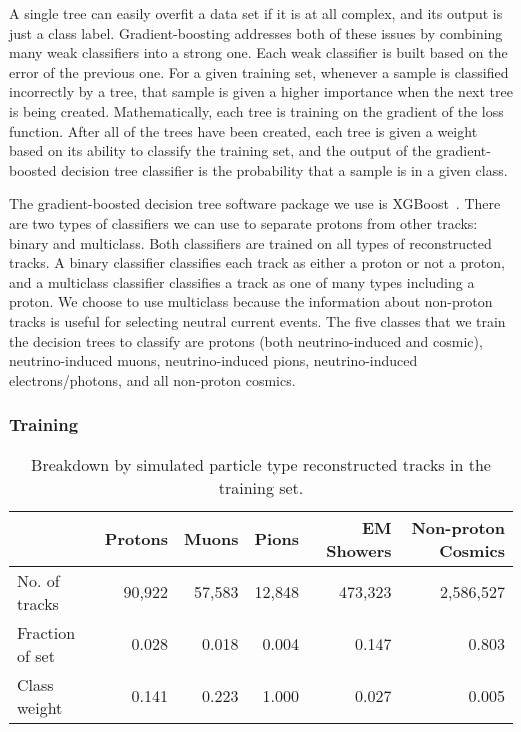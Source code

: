     A single tree can easily overfit a data set if it is at all complex, and
    its output is just a class label. Gradient-boosting addresses both of these
    issues by combining many weak classifiers into a strong one. Each weak
    classifier is built based on the error of the previous one. For a given
    training set, whenever a sample is classified incorrectly by a tree, that
    sample is given a higher importance when the next tree is being created.
    Mathematically, each tree is training on the gradient of the loss function.
    After all of the trees have been created, each tree is given a weight based
    on its ability to classify the training set, and the output of the
    gradient-boosted decision tree classifier is the probability that a sample
    is in a given class.
    
    The gradient-boosted decision tree software package we use is
    XGBoost~\cite{Chen:2016btl}. There are two types of classifiers we can use
    to separate protons from other tracks: binary and multiclass. Both
    classifiers are trained on all types of reconstructed tracks. A binary
    classifier classifies each track as either a proton or not a proton, and a
    multiclass classifier classifies a track as one of many types including a
    proton. We choose to use multiclass because the information about
    non-proton tracks is useful for selecting neutral current events. The five
    classes that we train the decision trees to classify are protons (both
    neutrino-induced and cosmic), neutrino-induced muons, neutrino-induced
    pions, neutrino-induced electrons/photons, and all non-proton cosmics.
    
  \subsubsection{Training}

    \begin{table}[ht]
      \caption{Breakdown by simulated particle type reconstructed tracks in the
        training set.
      \label{tab:mctrain}}
      \begin{tabularx}{\textwidth}{ l r r r r r }
        \hline
        & Protons & Muons & Pions & EM Showers & Non-proton Cosmics \\
        \hline
        No. of tracks  & 90,922 & 57,583 & 12,848 & 473,323 & 2,586,527 \\
        Fraction of set & 0.028 & 0.018 & 0.004 & 0.147 & 0.803 \\
        Class weight  & 0.141 & 0.223 & 1.000 & 0.027 & 0.005 \\
        \hline
      \end{tabularx}
    \end{table}

